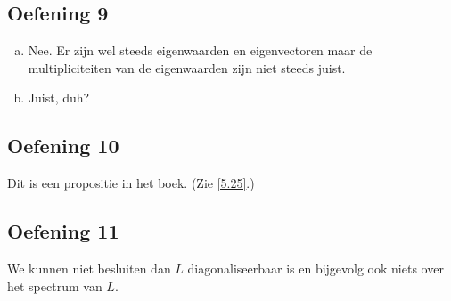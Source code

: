 \documentclass[lineaire_algebra_oplossingen.tex]{subfiles}
\begin{document}
\subsection{Oefening 9}
\begin{enumerate}[(a)]
\item Nee. Er zijn wel steeds eigenwaarden en eigenvectoren maar de multipliciteiten van de eigenwaarden zijn niet steeds juist.
\item Juist, duh?
\end{enumerate}

\subsection{Oefening 10}
Dit is een propositie in het boek. (Zie \ref{5.25}.)

\subsection{Oefening 11}
We kunnen niet besluiten dan $L$ diagonaliseerbaar is en bijgevolg ook niets over het spectrum van $L$.
\end{document}

